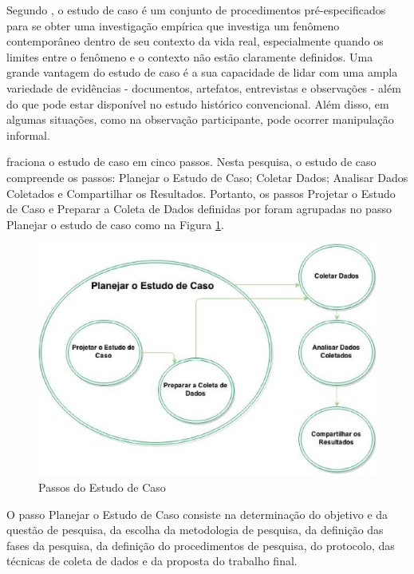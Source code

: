 Segundo \cite{yin2001estudo}, o estudo de caso é um conjunto de procedimentos pré-especificados para se obter uma investigação empírica que investiga um fenômeno contemporâneo dentro de seu contexto da vida real, especialmente quando os limites entre o fenômeno e o contexto não estão claramente definidos. Uma grande vantagem do estudo de caso é a sua capacidade de lidar com uma ampla variedade de evidências - documentos, artefatos, entrevistas e observações - além do que pode estar disponível no estudo histórico convencional. Além disso, em algumas situações, como na observação participante, pode ocorrer manipulação informal.

\cite{wohlin2012experimentation} fraciona o estudo de caso em cinco passos. Nesta pesquisa, o estudo de caso compreende os passos: Planejar o Estudo de Caso; Coletar Dados; Analisar Dados Coletados e Compartilhar os Resultados. Portanto, os passos Projetar o Estudo de Caso e Preparar a Coleta de Dados definidas por  foram agrupadas no passo Planejar o estudo de caso como na Figura \ref{passo Estudo de Caso}.

\begin{figure}[h!]
\centering
\includegraphics[keepaspectratio=false,scale=0.5]{figuras/figuras_nilton/passosEstudoCaso.eps}
\caption{Passos do Estudo de Caso}
\label{passo Estudo de Caso}
\end{figure}

O passo Planejar o Estudo de Caso consiste na determinação do objetivo e da questão de pesquisa, da escolha da metodologia de pesquisa, da definição das fases da pesquisa, da definição do procedimentos de pesquisa, do protocolo, das técnicas de coleta de dados e da proposta do trabalho final.

